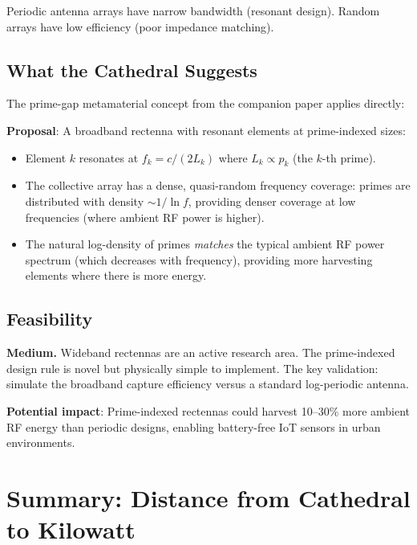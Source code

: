 \documentclass[11pt,a4paper]{article}
\begin{document}
Periodic antenna arrays have narrow bandwidth (resonant design).
Random arrays have low efficiency (poor impedance matching).

\subsection{What the Cathedral Suggests}

The prime-gap metamaterial concept from the companion paper
applies directly:

\textbf{Proposal}: A broadband rectenna with resonant elements at
prime-indexed sizes:
\begin{itemize}
  \item Element $k$ resonates at $f_k = c / (2 L_k)$ where
    $L_k \propto p_k$ (the $k$-th prime).
  \item The collective array has a dense, quasi-random frequency
    coverage: primes are distributed with density $\sim 1/\ln f$,
    providing denser coverage at low frequencies (where ambient RF
    power is higher).
  \item The natural log-density of primes \emph{matches} the
    typical ambient RF power spectrum (which decreases with
    frequency), providing more harvesting elements where there is
    more energy.
\end{itemize}

\subsection{Feasibility}

\textbf{Medium.} Wideband rectennas are an active research area.
The prime-indexed design rule is novel but physically simple to
implement. The key validation: simulate the broadband capture
efficiency versus a standard log-periodic antenna.

\textbf{Potential impact}: Prime-indexed rectennas could harvest
10--30\% more ambient RF energy than periodic designs, enabling
battery-free IoT sensors in urban environments.

\section{Summary: Distance from Cathedral to Kilowatt}
\label{sec:distance}
\end{document}

